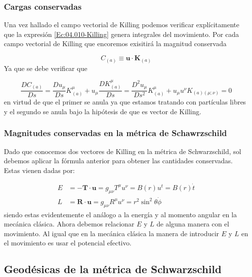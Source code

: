 \documentclass[12pt,a4paper]{book}
\numberwithin{equation}{section}
\numberwithin{figure}{section}
\newcommand{\un}{\mathbf{u}}
\newcommand{\Kn}{\mathbf{K}}
\newcommand{\Rn}{\mathbf{R}}
\newcommand{\Tn}{\mathbf{T}}
\begin{document}
\subsubsection{Cargas conservadas}

Una vez hallado el campo vectorial de Killing podemos verificar explícitamente que la expresión \ref{Ec:04.010-Killing} genera integrales del movimiento. Por cada campo vectorial de Killing que encoremos exisitirá la magnitud conservada

\begin{equation}
C_{(a)} \equiv \un \cdot \Kn_{(a)}
\end{equation}
Ya que se debe verificar que

\begin{equation}
\frac{D C_{(a)}}{D s} = \frac{D u_\mu}{D s} K^\mu_{(a)} + u_\mu \frac{D K^\mu_{(a)}}{D s} =  \frac{D^2 u_\mu}{D s^2} K^\mu_{(a)} + u_\mu u^\nu K_{(a) (\mu;\nu)} = 0 
\end{equation}
en virtud de que el primer se anula ya que estamos tratando con partículas libres y el segundo se anula bajo la hipótesis de que es vector de Killing.


\subsubsection{Magnitudes conservadas en la métrica de Schawrzschild}

Dado que conocemos dos vectores de Killing en la métrica de Schwarzschild, sol debemos aplicar la fórmula anterior para obtener las cantidades conservadas. Estas vienen dadas por:

\begin{align}
E  & = - \Tn \cdot \un = g_{\mu \nu} T^\mu u^\nu = B(r) u^t = B(r) \dot{t} \\
L  & =  \Rn \cdot \un = g_{\mu \nu} R^\mu u^\nu = r^2 \sin^2 \theta \dot{\phi}
\end{align}
siendo estas evidentemente el análogo a la energía y al momento angular en la mecánica clásica. Ahora debemos relacionar $E$ y $L$ de alguna manera con el movimiento. Al igual que en la mecánica clásica la manera de introducir $E$ y $L$ en el movimiento es usar el potencial efectivo. \\


\subsection{Geodésicas de la métrica de Schwarzschild}
\end{document}
